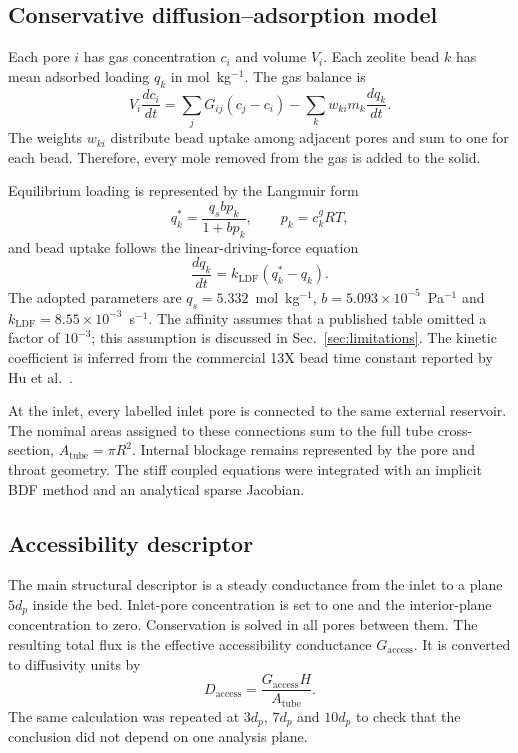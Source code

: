 \documentclass[11pt,a4paper]{article}
\begin{document}
\subsection{Conservative diffusion--adsorption model}

Each pore $i$ has gas concentration $c_i$ and volume $V_i$. Each zeolite bead
$k$ has mean adsorbed loading $q_k$ in mol~kg$^{-1}$. The gas balance is
\begin{equation}
 V_i\frac{dc_i}{dt}=\sum_jG_{ij}(c_j-c_i)
 -\sum_k w_{ki}m_k\frac{dq_k}{dt}.
 \label{eq:porebalance}
\end{equation}
The weights $w_{ki}$ distribute bead uptake among adjacent pores and sum to one
for each bead. Therefore, every mole removed from the gas is added to the
solid.

Equilibrium loading is represented by the Langmuir form
\begin{equation}
 q_k^*=\frac{q_sbp_k}{1+bp_k},\qquad p_k=c_k^gRT,
 \label{eq:langmuir}
\end{equation}
and bead uptake follows the linear-driving-force equation
\begin{equation}
 \frac{dq_k}{dt}=k_{\mathrm{LDF}}(q_k^*-q_k).
 \label{eq:ldf}
\end{equation}
The adopted parameters are $q_s=5.332$~mol~kg$^{-1}$,
$b=5.093\times10^{-5}$~Pa$^{-1}$ and
$k_{\mathrm{LDF}}=8.55\times10^{-3}$~s$^{-1}$. The affinity assumes that a
published table omitted a factor of $10^{-3}$; this assumption is discussed in
Sec.~\ref{sec:limitations}. The kinetic coefficient is inferred from the
commercial 13X bead time constant reported by Hu et al.~\cite{Hu2014}.

At the inlet, every labelled inlet pore is connected to the same external
reservoir. The nominal areas assigned to these connections sum to the full tube
cross-section, $A_{\mathrm{tube}}=\pi R^2$. Internal blockage remains represented
by the pore and throat geometry. The stiff coupled equations were integrated
with an implicit BDF method and an analytical sparse Jacobian.

\subsection{Accessibility descriptor}

The main structural descriptor is a steady conductance from the inlet to a
plane $5d_p$ inside the bed. Inlet-pore concentration is set to one and the
interior-plane concentration to zero. Conservation is solved in all pores
between them. The resulting total flux is the effective accessibility
conductance $G_{\mathrm{access}}$. It is converted to diffusivity units by
\begin{equation}
 D_{\mathrm{access}}=
 \frac{G_{\mathrm{access}}H}{A_{\mathrm{tube}}}.
 \label{eq:daccess}
\end{equation}
The same calculation was repeated at $3d_p$, $7d_p$ and $10d_p$ to check that
the conclusion did not depend on one analysis plane.
\end{document}
